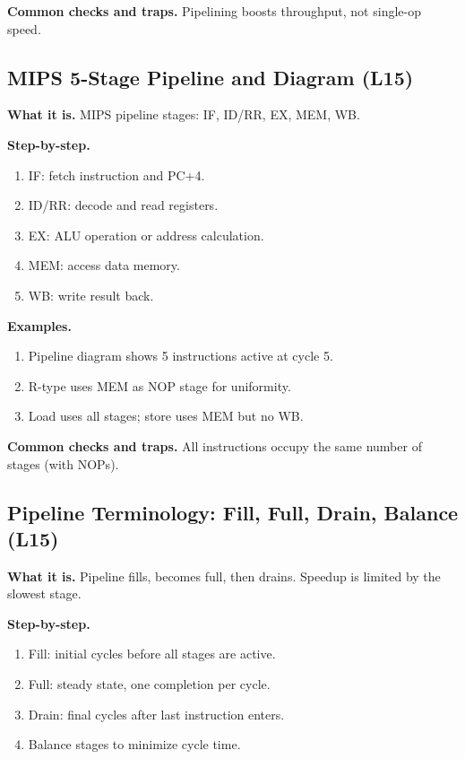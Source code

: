 \documentclass[11pt]{article}
\begin{document}
\textbf{Common checks and traps.} Pipelining boosts throughput, not single-op speed.

\subsection{MIPS 5-Stage Pipeline and Diagram (L15)}
\textbf{What it is.} MIPS pipeline stages: IF, ID/RR, EX, MEM, WB.

\textbf{Step-by-step.}
\begin{enumerate}[leftmargin=*]
  \item IF: fetch instruction and PC+4.
  \item ID/RR: decode and read registers.
  \item EX: ALU operation or address calculation.
  \item MEM: access data memory.
  \item WB: write result back.
\end{enumerate}

\textbf{Examples.}
\begin{enumerate}[leftmargin=*]
  \item Pipeline diagram shows 5 instructions active at cycle 5.
  \item R-type uses MEM as NOP stage for uniformity.
  \item Load uses all stages; store uses MEM but no WB.
\end{enumerate}

\textbf{Common checks and traps.} All instructions occupy the same number of stages (with NOPs).

\begin{figure}[h]
\centering
{}
\end{figure}

\subsection{Pipeline Terminology: Fill, Full, Drain, Balance (L15)}
\textbf{What it is.} Pipeline fills, becomes full, then drains. Speedup is limited by the slowest stage.

\textbf{Step-by-step.}
\begin{enumerate}[leftmargin=*]
  \item Fill: initial cycles before all stages are active.
  \item Full: steady state, one completion per cycle.
  \item Drain: final cycles after last instruction enters.
  \item Balance stages to minimize cycle time.
\end{enumerate}
\end{document}

